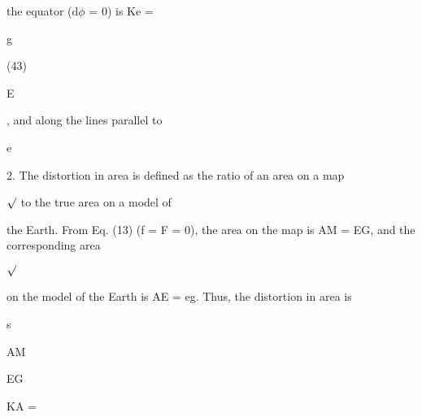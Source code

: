 \documentclass[a4paper,portrait,12pt]{article}
\begin{document}
\begin{flushleft}
the equator (d$\phi$ = 0) is Ke =
\end{flushleft}


\begin{flushleft}
g
\end{flushleft}





(43)


\begin{flushleft}
E
\end{flushleft}


\begin{flushleft}
, and along the lines parallel to
\end{flushleft}


\begin{flushleft}
e
\end{flushleft}





\begin{flushleft}
2. The distortion in area is defined as the ratio of an area on a map
\end{flushleft}


\begin{flushleft}
$\surd$ to the true area on a model of
\end{flushleft}


\begin{flushleft}
the Earth. From Eq. (13) (f = F = 0), the area on the map is AM = EG, and the corresponding area
\end{flushleft}


$\surd$


\begin{flushleft}
on the model of the Earth is AE = eg. Thus, the distortion in area is
\end{flushleft}


\begin{flushleft}
s
\end{flushleft}


\begin{flushleft}
AM
\end{flushleft}


\begin{flushleft}
EG
\end{flushleft}


\begin{flushleft}
KA =
\end{flushleft}
\end{document}
